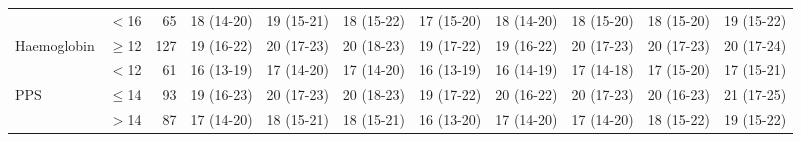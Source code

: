 \begin{sidewaystable}[p]
\begin{tabular}{|llr | c c c c c c c c|}
		                    & $<$16     &  65 & 18 (14-20) & 19 (15-21) & 18 (15-22) & 17 (15-20) & 18 (14-20) & 18 (15-20) & 18 (15-20) & 19 (15-22) \\
		Haemoglobin         & $\geq$12  & 127 & 19 (16-22) & 20 (17-23) & 20 (18-23) & 19 (17-22) & 19 (16-22) & 20 (17-23) & 20 (17-23) & 20 (17-24) \\
		                    & $<$12     &  61 & 16 (13-19) & 17 (14-20) & 17 (14-20) & 16 (13-19) & 16 (14-19) & 17 (14-18) & 17 (15-20) & 17 (15-21) \\
		PPS                 & $\leq$14  &  93 & 19 (16-23) & 20 (17-23) & 20 (18-23) & 19 (17-22) & 20 (16-22) & 20 (17-23) & 20 (16-23) & 21 (17-25) \\
		                    & $>$14     &  87 & 17 (14-20) & 18 (15-21) & 18 (15-21) & 16 (13-20) & 17 (14-20) & 17 (14-20) & 18 (15-22) & 19 (15-22) \\ \hline
	\end{tabular}	
\end{sidewaystable}







































